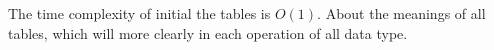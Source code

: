 The time complexity of initial the tables is $O(1)$. About the meanings of all tables, which will more clearly in each operation of all data type.

\clearpage











\clearpage



\clearpage

